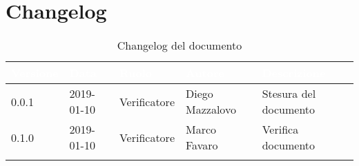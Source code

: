\newpage

\section{Changelog}

\begin{center}
\begin{longtable}[c]{|m{}|m{}|m{}|m{}|p{}|}
\hline
\rowcolor{bluelogo}\textbf{\textcolor{white}{Versione}} & \textbf{\textcolor{white}{Data}} & \textbf{\textcolor{white}{Ruolo}} & \textbf{\textcolor{white}{Autore}} & \textbf{\textcolor{white}{Descrizione}}\\
\hline 
\endfirsthead
0.0.1 & 2019-01-10 & Verificatore & Diego Mazzalovo & Stesura del documento \\
\hline
\rowcolor{grigio}0.1.0 & 2019-01-10 & Verificatore & Marco Favaro & Verifica documento\\
\hline
\caption{Changelog del documento}
\end{longtable}
\end{center}
